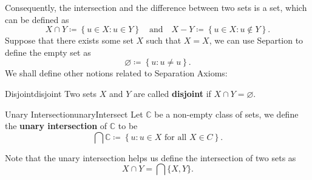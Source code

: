 \documentclass[math]{amznotes}
\theoremstyle{remark}
\begin{document}
    Consequently, the intersection and the difference between two sets is a set, which can be defined as
    \begin{displaymath}
        X \cap Y \coloneqq \left\{u \in X \colon u \in Y\right\} \quad \textrm{and} \quad X - Y \coloneqq \left\{u \in X \colon u \notin Y\right\}. 
    \end{displaymath}
    Suppose that there exists some set $X$ such that $X = X$, we can use Separtion to define the empty set as
    \begin{displaymath}
        \varnothing \coloneqq \left\{u \colon u \neq u\right\}.
    \end{displaymath}
    We shall define other notions related to Separation Axioms:
    \begin{dfnbox}{Disjoint}{disjoint}
        Two sets $X$ and $Y$ are called {\color{red} \textbf{disjoint}} if $X \cap Y = \varnothing$.
    \end{dfnbox}
    \begin{dfnbox}{Unary Intersection}{unaryIntersect}
        Let $\mathbb{C}$ be a non-empty class of sets, we define the {\color{red} \textbf{unary intersection}} of $\mathbb{C}$ to be
        \begin{displaymath}
            \bigcap \mathbb{C} \coloneqq \left\{u \colon u \in X \textrm{ for all } X \in C\right\}.
        \end{displaymath}
    \end{dfnbox}   
    Note that the unary intersection helps us define the intersection of two sets as 
    \begin{equation*}
        X \cap Y = \bigcap\{X, Y\}.
    \end{equation*} 
\end{document}
